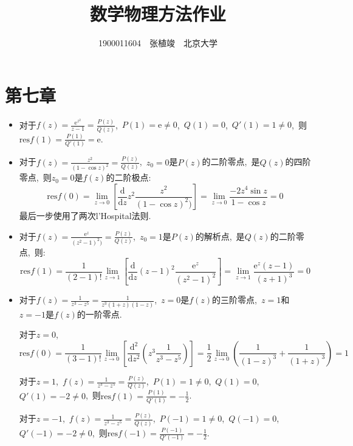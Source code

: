 \documentclass[a4paper,fontset=windows]{ctexart}
\begin{document}
\title{\textbf{数学物理方法作业}}
\author{1900011604\ \ 张植竣\ \ 北京大学}
\date{}
\maketitle

\newpage
\section*{第七章}
\bigskip

\begin{itemize}

\item[1.(1)]
对于$f(z)=\frac{\mathrm{e}^{z^2}}{z-1}=\frac{P(z)}{Q(z)}$,\ $P(1)=\mathrm{e}\neq0$,\ $Q(1)=0$,\ $Q'(1)=1\neq0$,\ 则$\mathrm{res}f(1)=\frac{P(1)}{Q'(1)}=\mathrm{e}$.

\smallskip
\item[1.(3)]
对于$f(z)=\frac{z^2}{(1-\cos{z})^2}=\frac{P(z)}{Q(z)}$,\ $z_0=0$是$P(z)$的二阶零点,\ 是$Q(z)$的四阶零点,\ 则$z_0=0$是$f(z)$的二阶极点:
\[
\mathrm{res}f(0)
={\lim_{z \to 0}}\left[\frac{\mathrm{d}}{\mathrm{d}z}z^2\frac{z^2}{(1-\cos{z})^2)}\right]
={\lim_{z \to 0}}\frac{-2z^4\sin z}{1-\cos z}
=0
\]
最后一步使用了两次l'Hospital法则.

\smallskip
\item[1.(5)]
对于$f(z)=\frac{\mathrm{e}^z}{(z^2-1)^2)}=\frac{P(z)}{Q(z)}$,\ $z_0=1$是$P(z)$的解析点,\ 是$Q(z)$的二阶零点,\ 则:
\[
\mathrm{res}f(1)
=\frac{1}{(2-1)!}{\lim_{z \to 1}}\left[\frac{\mathrm{d}}{\mathrm{d}z}(z-1)^2\frac{\mathrm{e}^z}{(z^2-1)^2}\right]
={\lim_{z \to 1}}\frac{\mathrm{e}^z(z-1)}{(z+1)^3}
=0
\]

\bigskip
\item[2.(1)]
对于$f(z)=\frac{1}{z^3-z^5}=\frac{1}{z^3(1+z)(1-z)}$,\ $z=0$是$f(z)$的三阶零点,\ $z=1$和$z=-1$是$f(z)$的一阶零点.

对于$z=0$, 
\[
\mathrm{res}f(0)
=\frac{1}{(3-1)!}{\lim_{z \to 0}}\left[\frac{\mathrm{d}^2}{\mathrm{d}z^2}\left(z^3\frac{1}{z^3-z^5}\right)\right]
=\frac{1}{2}{\lim_{z \to 0}}\left(\frac{1}{(1-z)^3}+\frac{1}{(1+z)^3}\right)
=1
\]

对于$z=1$,\ $f(z)=\frac{1}{z^3-z^5}=\frac{P(z)}{Q(z)}$,\ $P(1)=1\neq0$,\ $Q(1)=0$,\ $Q'(1)=-2\neq0$,\ 则$\mathrm{res}f(1)=\frac{P(1)}{Q'(1)}=-\frac{1}{2}$.

对于$z=-1$,\ $f(z)=\frac{1}{z^3-z^5}=\frac{P(z)}{Q(z)}$,\ $P(-1)=1\neq0$,\ $Q(-1)=0$,\ $Q'(-1)=-2\neq0$,\ 则$\mathrm{res}f(-1)=\frac{P(-1)}{Q'(-1)}=-\frac{1}{2}$.


\end{itemize}
\end{document}
